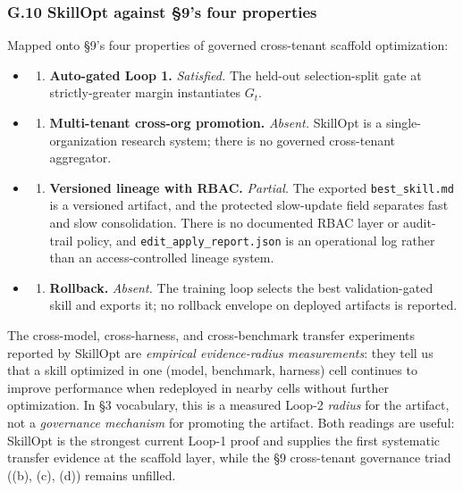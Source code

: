 \documentclass[
]{article}
\providecommand{\tightlist}{%
  \setlength{\itemsep}{0pt}\setlength{\parskip}{0pt}}
\begin{document}
\subsubsection{G.10 SkillOpt against §9's four
properties}\label{g.10-skillopt-against-9s-four-properties}

Mapped onto §9's four properties of governed cross-tenant scaffold
optimization:

\begin{itemize}
\tightlist
\item
  \begin{enumerate}
  \def\labelenumi{(\alph{enumi})}
  \tightlist
  \item
    \textbf{Auto-gated Loop 1.} \emph{Satisfied.} The held-out
    selection-split gate at strictly-greater margin instantiates
    \(G_t\).
  \end{enumerate}
\item
  \begin{enumerate}
  \def\labelenumi{(\alph{enumi})}
  \setcounter{enumi}{1}
  \tightlist
  \item
    \textbf{Multi-tenant cross-org promotion.} \emph{Absent.} SkillOpt
    is a single-organization research system; there is no governed
    cross-tenant aggregator.
  \end{enumerate}
\item
  \begin{enumerate}
  \def\labelenumi{(\alph{enumi})}
  \setcounter{enumi}{2}
  \tightlist
  \item
    \textbf{Versioned lineage with RBAC.} \emph{Partial.} The exported
    \texttt{best\_skill.md} is a versioned artifact, and the protected
    slow-update field separates fast and slow consolidation. There is no
    documented RBAC layer or audit-trail policy, and
    \texttt{edit\_apply\_report.json} is an operational log rather than
    an access-controlled lineage system.
  \end{enumerate}
\item
  \begin{enumerate}
  \def\labelenumi{(\alph{enumi})}
  \setcounter{enumi}{3}
  \tightlist
  \item
    \textbf{Rollback.} \emph{Absent.} The training loop selects the best
    validation-gated skill and exports it; no rollback envelope on
    deployed artifacts is reported.
  \end{enumerate}
\end{itemize}

The cross-model, cross-harness, and cross-benchmark transfer experiments
reported by SkillOpt are \emph{empirical evidence-radius measurements}:
they tell us that a skill optimized in one (model, benchmark, harness)
cell continues to improve performance when redeployed in nearby cells
without further optimization. In §3 vocabulary, this is a measured
Loop-2 \emph{radius} for the artifact, not a \emph{governance mechanism}
for promoting the artifact. Both readings are useful: SkillOpt is the
strongest current Loop-1 proof and supplies the first systematic
transfer evidence at the scaffold layer, while the §9 cross-tenant
governance triad ((b), (c), (d)) remains unfilled.
\end{document}
